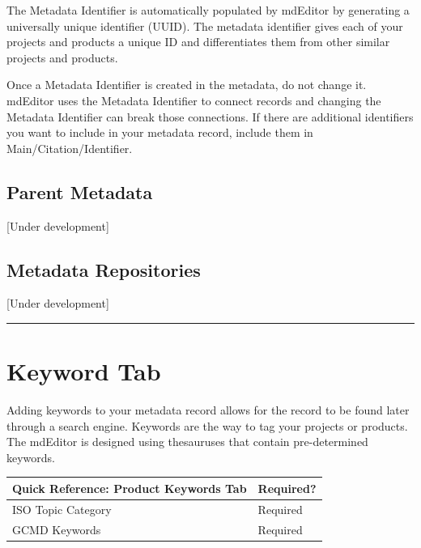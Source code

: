 \documentclass[
]{book}
\makeatletter
\newenvironment{kframe}{%
\medskip{}
\setlength{\fboxsep}{.8em}
 \def\at@end@of@kframe{}%
 \ifinner\ifhmode%
  \def\at@end@of@kframe{\end{minipage}}%
  \begin{minipage}{\columnwidth}%
 \fi\fi%
 \def\FrameCommand##1{\hskip\@totalleftmargin \hskip-\fboxsep
 \colorbox{shadecolor}{##1}\hskip-\fboxsep
     \hskip-\linewidth \hskip-\@totalleftmargin \hskip\columnwidth}%
 \MakeFramed {\advance\hsize-\width
   \@totalleftmargin\z@ \linewidth\hsize
   \@setminipage}}%
 {\par\unskip\endMakeFramed%
 \at@end@of@kframe}
\newenvironment{rmdblock}[1]
  {
  \begin{itemize}
  \renewcommand{\labelitemi}{
    \raisebox{-.7\height}[0pt][0pt]{
      {\setkeys{Gin}{width=3em,keepaspectratio}\texttt{[image: images/\#1]}}
    }
  }
  \setlength{\fboxsep}{1em}
  \begin{kframe}
  \item
  }
  {
  \end{kframe}
  \end{itemize}
  }
\newenvironment{rmdwarning}
  {\begin{rmdblock}{warning}}
  {\end{rmdblock}}
\makeatother
\begin{document}
The Metadata Identifier is automatically populated by mdEditor by generating a universally unique identifier (UUID). The metadata identifier gives each of your projects and products a unique ID and differentiates them from other similar projects and products.

\begin{rmdwarning}
Once a Metadata Identifier is created in the metadata, do not change it.
mdEditor uses the Metadata Identifier to connect records and changing
the Metadata Identifier can break those connections. If there are
additional identifiers you want to include in your metadata record,
include them in Main/Citation/Identifier.
\end{rmdwarning}

\hypertarget{parent-metadata-1}{%
\subsection*{Parent Metadata}\label{parent-metadata-1}}

{[}Under development{]}

\hypertarget{metadata-repositories-1}{%
\subsection*{Metadata Repositories}\label{metadata-repositories-1}}

{[}Under development{]}

\begin{center}\rule{0.5\linewidth}{\linethickness}\end{center}

\hypertarget{product-keywords}{%
\section*{Keyword Tab}\label{product-keywords}}

Adding keywords to your metadata record allows for the record to be found later through a search engine. Keywords are the way to tag your projects or products. The mdEditor is designed using thesauruses that contain pre-determined keywords.

\begin{longtable}[]{@{}ll@{}}
\toprule
Quick Reference: Product Keywords Tab & Required?\tabularnewline
\midrule
\endhead
ISO Topic Category & Required\tabularnewline
GCMD Keywords & Required\tabularnewline
\bottomrule
\end{longtable}
\end{document}
